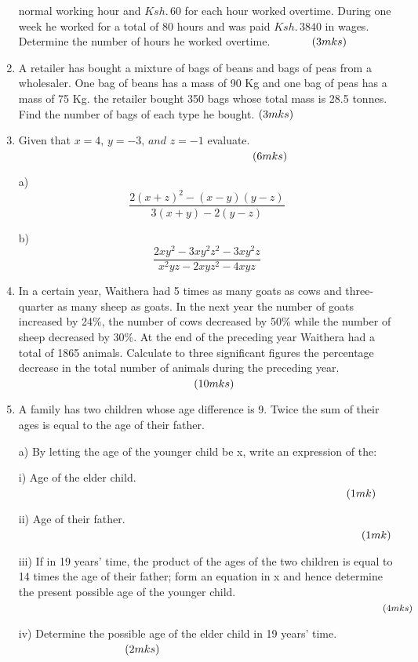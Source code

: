 \documentclass[
  a4paperpaper,
]{scrbook}
\begin{document}
\begin{tcolorbox}
\begin{enumerate}
  normal working hour and \(Ksh.\, 60\) for each hour worked overtime.
  During one week he worked for a total of 80 hours and was paid
  \(Ksh. \,3840\) in wages. Determine the number of hours he worked
  overtime. \(\hspace{1.2cm}(3mks)\)
\item
  A retailer has bought a mixture of bags of beans and bags of peas from
  a wholesaler. One bag of beans has a mass of 90 Kg and one bag of peas
  has a mass of 75 Kg. the retailer bought 350 bags whose total mass is
  28.5 tonnes. Find the number of bags of each type he bought.
  \(\hspace{-0cm} (3mks)\)
\item
  Given that \(x=4,\, y= -3 ,\, and \,\,z= -1\) evaluate.
  \(\hspace{7.5cm} (6mks)\)

  a) \[ \frac{2(x+z)^2-(x-y)(y-z)}{3(x+y)-2(y-z)}\]

  b) \[
  \frac{2xy^2-3xy^2z^2-3xy^2z}{x^2yz-2xyz^2-4xyz}
  \]
\item
  In a certain year, Waithera had 5 times as many goats as cows and
  three-quarter as many sheep as goats. In the next year the number of
  goats increased by 24\%, the number of cows decreased by 50\% while
  the number of sheep decreased by 30\%. At the end of the preceding
  year Waithera had a total of 1865 animals. Calculate to three
  significant figures the percentage decrease in the total number of
  animals during the preceding year. \(\hspace{5.6cm} (10mks)\)
\item
  A family has two children whose age difference is 9. Twice the sum of
  their ages is equal to the age of their father.

  a) By letting the age of the younger child be x, write an expression
  of the:

  i) Age of the elder child. \(\hspace{10.5 cm} (1mk)\)

  ii) Age of their father. \(\hspace{11 cm} (1mk)\)

  iii) If in 19 years' time, the product of the ages of the two children
  is equal to 14 times the age of their father; form an equation in x
  and hence determine the present possible age of the younger child.
  \(\hspace{13.6 cm} (4mks)\)

  iv) Determine the possible age of the elder child in 19 years' time.
  \(\hspace{3.4 cm}(2mks)\)


\end{enumerate}
\end{tcolorbox}
\end{document}
